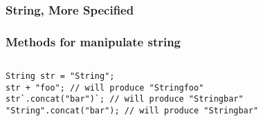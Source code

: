 \documentclass[
  11pt, %
  xcolor=dvipsnames
]{beamer}
\begin{document}
\begin{frame}[fragile]
\begin{columns}[c]
\begin{column}{0.9\textwidth}
\begin{table}
\begin{tabular}{l l l}
					\bottomrule
				\end{tabular}
			\end{table}


		\end{column}
	\end{columns}

\end{frame}



\subsubsection{String, More Specified}
\begin{frame}[fragile]
	\frametitle{Methods for manipulate string}


	\begin{columns}[c]
		\begin{column}{0.9\textwidth}

			\begin{lstlisting}[style=Java]
String str = "String";
str + "foo"; // will produce "Stringfoo"
str`.concat("bar")`; // will produce "Stringbar"
"String".concat("bar"); // will produce "Stringbar"
      \end{lstlisting}



\end{column}
\end{columns}
\end{frame}
\end{document}
